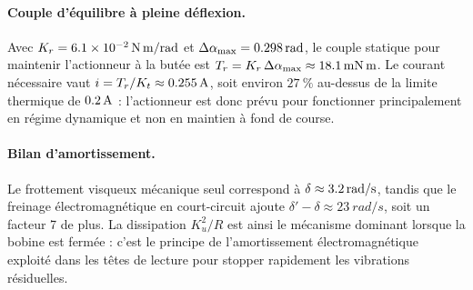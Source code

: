 \paragraph{Couple d'équilibre à pleine déflexion.} Avec \(K_r = \SI{6{,}1e-2}{N.m/rad}\) et \(\Delta\alpha_{\max} = \SI{0{,}298}{rad}\), le couple statique pour maintenir l'actionneur à la butée est \(T_r = K_r\,\Delta\alpha_{\max} \approx \SI{18{,}1}{mN.m}\). Le courant nécessaire vaut \(i = T_r/K_t \approx \SI{0{,}255}{A}\), soit environ \(\SI{27}{\%}\) au-dessus de la limite thermique de \(\SI{0{,}2}{A}\) : l'actionneur est donc prévu pour fonctionner principalement en régime dynamique et non en maintien à fond de course.

\paragraph{Bilan d'amortissement.} Le frottement visqueux mécanique seul correspond à \(\delta \approx \SI{3{,}2}{rad/s}\), tandis que le freinage électromagnétique en court-circuit ajoute \(\delta' - \delta \approx \SI{23}{rad/s}\), soit un facteur 7 de plus. La dissipation \(K_u^2/R\) est ainsi le mécanisme dominant lorsque la bobine est fermée : c'est le principe de l'amortissement électromagnétique exploité dans les têtes de lecture pour stopper rapidement les vibrations résiduelles.
